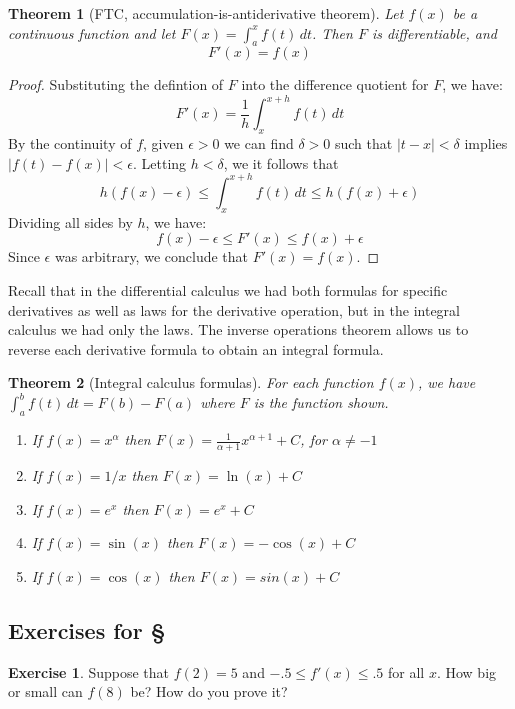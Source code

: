 \documentclass[11pt,oneside]{amsbook}
\theoremstyle{definition}
\newtheorem{exerc}{Exercise}[section]
\theoremstyle{plain}
\newtheorem{theorem}{Theorem}[section]
\theoremstyle{definition}
\theoremstyle{remark}
\numberwithin{equation}{section}
\numberwithin{figure}{section}
\begin{document}
\begin{theorem}[FTC, accumulation-is-antiderivative theorem]
  Let $f(x)$ be a continuous function and let $F(x)=\int_a^x f(t)\,dt$. Then $F$ is differentiable, and
  \[F'(x)=f(x)
  \]
\end{theorem}

\begin{proof}
  Substituting the defintion of $F$ into the difference quotient for $F$, we have:
  \[F'(x)=\frac{1}{h}\int_x^{x+h} f(t)\,dt
  \]
  By the continuity of $f$, given $\epsilon>0$ we can find $\delta>0$ such that $|t-x|<\delta$ implies $|f(t)-f(x)|<\epsilon$. Letting $h<\delta$, we it follows that
  \[h(f(x)-\epsilon)\leq\int_x^{x+h} f(t)\,dt\leq h(f(x)+\epsilon)
  \]
  Dividing all sides by $h$, we have:
  \[f(x)-\epsilon\leq F'(x)\leq f(x)+\epsilon
  \]
  Since $\epsilon$ was arbitrary, we conclude that $F'(x)=f(x)$.
\end{proof}

Recall that in the differential calculus we had both formulas for specific derivatives as well as laws for the derivative operation, but in the integral calculus we had only the laws. The inverse operations theorem allows us to reverse each derivative formula to obtain an integral formula.

\begin{theorem}[Integral calculus formulas]
  For each function $f(x)$, we have $\int_a^bf(t)\,dt=F(b)-F(a)$ where $F$ is the function shown.
  \begin{enumerate}
    \item If $f(x)=x^\alpha$ then $F(x)=\frac{1}{\alpha+1}x^{\alpha+1}+C$, for $\alpha\neq-1$
    \item If $f(x)=1/x$ then $F(x)=\ln(x)+C$
    \item If $f(x)=e^x$ then $F(x)=e^x+C$
    \item If $f(x)=\sin(x)$ then $F(x)=-\cos(x)+C$
    \item If $f(x)=\cos(x)$ then $F(x)=sin(x)+C$
  \end{enumerate}
\end{theorem}

\newpage
\subsection*{Exercises for \S \thesection}

\begin{exerc}
  Suppose that $f(2)=5$ and $-.5\leq f'(x)\leq.5$ for all $x$. How big or small can $f(8)$ be? How do you prove it?
\end{exerc}
\end{document}
